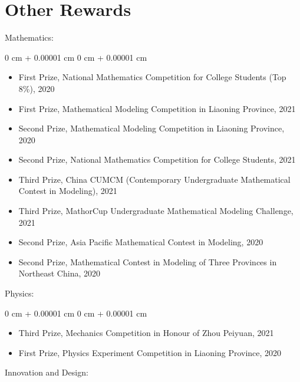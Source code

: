 \documentclass[10pt, letterpaper]{article}
\newenvironment{highlights}{
    \begin{itemize}[
        topsep=0.10 cm,
        parsep=0.10 cm,
        partopsep=0pt,
        itemsep=0pt,
        leftmargin=0 cm + 10pt
    ]
}{
    \end{itemize}
} %
\newenvironment{onecolentry}{
    \begin{adjustwidth}{
        0 cm + 0.00001 cm
    }{
        0 cm + 0.00001 cm
    }
}{
    \end{adjustwidth}
} %
\begin{document}
    \section{Other Rewards}

Mathematics:
    \vspace{0.10 cm}
    \begin{onecolentry}
        \begin{highlights}
            \item First Prize, National Mathematics Competition for College Students (Top 8\%), 2020
            \item First Prize, Mathematical Modeling Competition in Liaoning Province, 2021
            \item Second Prize, Mathematical Modeling Competition in Liaoning Province, 2020
            \item Second Prize, National Mathematics Competition for College Students, 2021
            \item Third Prize, China CUMCM (Contemporary Undergraduate Mathematical Contest in Modeling), 2021
            \item Third Prize, MathorCup Undergraduate Mathematical Modeling Challenge, 2021
            \item Second Prize, Asia Pacific Mathematical Contest in Modeling, 2020
            \item Second Prize, Mathematical Contest in Modeling of Three Provinces in Northeast China, 2020
        \end{highlights}
    \end{onecolentry}

    \vspace{0.2 cm}

Physics:

    \vspace{0.10 cm}
    \begin{onecolentry}
        \begin{highlights}
            \item Third Prize, Mechanics Competition in Honour of Zhou Peiyuan, 2021
            \item First Prize, Physics Experiment Competition in Liaoning Province, 2020
        \end{highlights}
    \end{onecolentry}

    \vspace{0.2 cm}

Innovation and Design:
\end{document}
